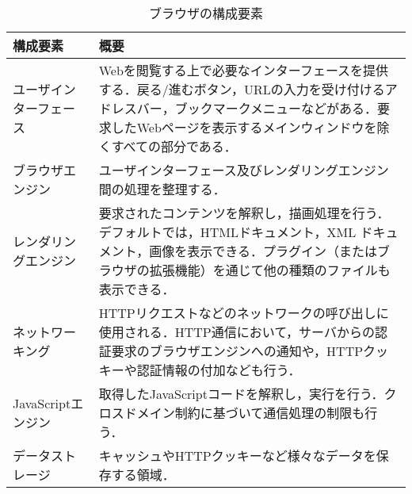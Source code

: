 \begin{table}[H]
\centering
\caption{ブラウザの構成要素}
\label{tb-browser}
\begin{tabular}{l|p{30em}}
構成要素 & 概要  \\ \hline\hline
ユーザインターフェース    & Webを閲覧する上で必要なインターフェースを提供する．戻る/進むボタン，URLの入力を受け付けるアドレスバー，ブックマークメニューなどがある．要求したWebページを表示するメインウィンドウを除くすべての部分である． \\\hline
ブラウザエンジン       & ユーザインターフェース及びレンダリングエンジン間の処理を整理する．\\\hline
レンダリングエンジン     & 要求されたコンテンツを解釈し，描画処理を行う．デフォルトでは，HTMLドキュメント，XML ドキュメント，画像を表示できる．プラグイン（またはブラウザの拡張機能）を通じて他の種類のファイルも表示できる．       \\\hline
ネットワーキング       & HTTPリクエストなどのネットワークの呼び出しに使用される．HTTP通信において，サーバからの認証要求のブラウザエンジンへの通知や，HTTPクッキーや認証情報の付加なども行う．\\\hline
JavaScriptエンジン & 取得したJavaScriptコードを解釈し，実行を行う．クロスドメイン制約に基づいて通信処理の制限も行う．\\\hline
データストレージ       & キャッシュやHTTPクッキーなど様々なデータを保存する領域．                     
\end{tabular}
\end{table}